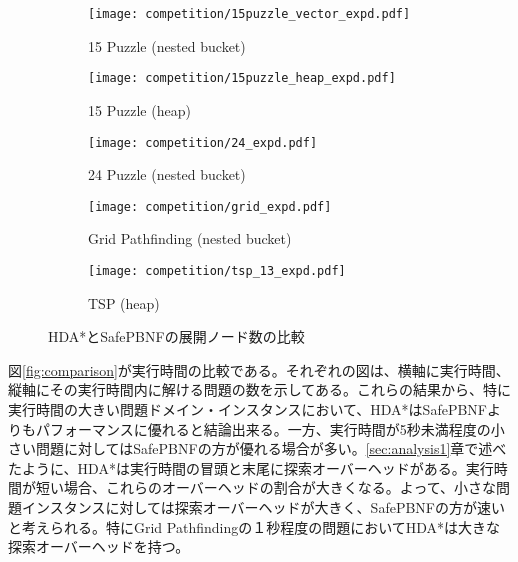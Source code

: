 \documentclass[uplatex]{jsarticle}
\begin{document}
\begin{figure}[h]
	\centering
	\begin{subfigure}{0.4\columnwidth}
		\texttt{[image: competition/15puzzle\_vector\_expd.pdf]}
		\caption{15 Puzzle (nested bucket)}
		\label{fig:15puzzle_vector_expd}
	\end{subfigure}
	\begin{subfigure}{0.4\columnwidth}
		\texttt{[image: competition/15puzzle\_heap\_expd.pdf]}
		\caption{15 Puzzle (heap)}
		\label{fig:15puzzle_heap_expd}
	\end{subfigure}
	\begin{subfigure}{0.4\columnwidth}
		\texttt{[image: competition/24\_expd.pdf]}
		\caption{24 Puzzle (nested bucket)}
		\label{fig:24puzzle_vector_expd}
	\end{subfigure}
	\begin{subfigure}{0.4\columnwidth}
		\texttt{[image: competition/grid\_expd.pdf]}
		\caption{Grid Pathfinding (nested bucket)}
		\label{fig:grid_expd}
	\end{subfigure}
	\begin{subfigure}{0.4\columnwidth}
		\texttt{[image: competition/tsp\_13\_expd.pdf]}
		\caption{TSP (heap)} %
		\label{fig:tsp_13_expd}
	\end{subfigure}
	\caption{HDA*とSafePBNFの展開ノード数の比較}
	\label{fig:comparison_expd}
\end{figure}%


図\ref{fig:comparison}が実行時間の比較である。それぞれの図は、横軸に実行時間、縦軸にその実行時間内に解ける問題の数を示してある。これらの結果から、特に実行時間の大きい問題ドメイン・インスタンスにおいて、HDA*はSafePBNFよりもパフォーマンスに優れると結論出来る。一方、実行時間が5秒未満程度の小さい問題に対してはSafePBNFの方が優れる場合が多い。\ref{sec:analysis1}章で述べたように、HDA*は実行時間の冒頭と末尾に探索オーバーヘッドがある。実行時間が短い場合、これらのオーバーヘッドの割合が大きくなる。よって、小さな問題インスタンスに対しては探索オーバーヘッドが大きく、SafePBNFの方が速いと考えられる。特にGrid Pathfindingの１秒程度の問題においてHDA*は大きな探索オーバーヘッドを持つ。
\end{document}
